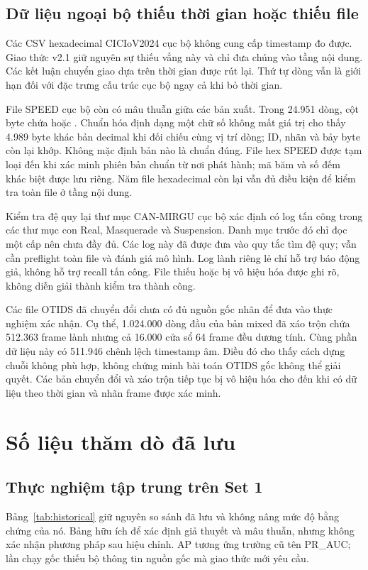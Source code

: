 \documentclass[12pt,a4paper,oneside,openany]{extbook}
\DeclareRobustCommand{\code}[1]{\texttt{\detokenize{#1}}}
\begin{document}
\subsection{Dữ liệu ngoại bộ thiếu thời gian hoặc thiếu file}
Các CSV hexadecimal CICIoV2024 cục bộ không cung cấp timestamp đo được. Giao thức v2.1 giữ nguyên sự thiếu vắng này và chỉ đưa chúng vào tầng nội dung. Các kết luận chuyển giao dựa trên thời gian được rút lại. Thứ tự dòng vẫn là giới hạn đối với đặc trưng cấu trúc cục bộ ngay cả khi bỏ thời gian.

File SPEED cục bộ còn có mâu thuẫn giữa các bản xuất. Trong 24.951 dòng, cột byte \code{DATA_6} chứa \code{2.0} hoặc \code{0.0}. Chuẩn hóa định dạng một chữ số không mất giá trị cho thấy 4.989 byte khác bản decimal khi đối chiếu cùng vị trí dòng; ID, nhãn và bảy byte còn lại khớp. Không mặc định bản nào là chuẩn đúng. File hex SPEED được tạm loại đến khi xác minh phiên bản chuẩn từ nơi phát hành; mã băm và số đếm khác biệt được lưu riêng. Năm file hexadecimal còn lại vẫn đủ điều kiện để kiểm tra toàn file ở tầng nội dung.

Kiểm tra đệ quy lại thư mục CAN-MIRGU cục bộ xác định có log tấn công trong các thư mục con Real, Masquerade và Suspension. Danh mục trước đó chỉ đọc một cấp nên chưa đầy đủ. Các log này đã được đưa vào quy tắc tìm đệ quy; vẫn cần preflight toàn file và đánh giá mô hình. Log lành riêng lẻ chỉ hỗ trợ báo động giả, không hỗ trợ recall tấn công. File thiếu hoặc bị vô hiệu hóa được ghi rõ, không diễn giải thành kiểm tra thành công.

Các file OTIDS đã chuyển đổi chưa có đủ nguồn gốc nhãn để đưa vào thực nghiệm xác nhận. Cụ thể, 1.024.000 dòng đầu của bản mixed đã xáo trộn chứa 512.363 frame lành nhưng cả 16.000 cửa sổ 64 frame đều dương tính. Cùng phần dữ liệu này có 511.946 chênh lệch timestamp âm. Điều đó cho thấy cách dựng chuỗi không phù hợp, không chứng minh bài toán OTIDS gốc không thể giải quyết. Các bản chuyển đổi và xáo trộn tiếp tục bị vô hiệu hóa cho đến khi có dữ liệu theo thời gian và nhãn frame được xác minh.

\section{Số liệu thăm dò đã lưu}
\subsection{Thực nghiệm tập trung trên Set 1}
Bảng~\ref{tab:historical} giữ nguyên so sánh đã lưu và không nâng mức độ bằng chứng của nó. Bảng hữu ích để xác định giả thuyết và mâu thuẫn, nhưng không xác nhận phương pháp sau hiệu chỉnh. AP tương ứng trường cũ tên PR\_AUC; lần chạy gốc thiếu bộ thông tin nguồn gốc mà giao thức mới yêu cầu.
\end{document}
